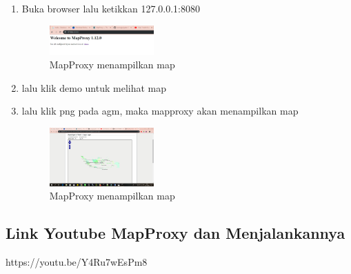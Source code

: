 \begin{enumerate}
  \item Buka browser lalu ketikkan 127.0.0.1:8080
  \hfill\break
  \begin{figure}[H]
  \includegraphics[width=4cm]{figures/tugas4/1174069/24.png}
  \centering
  \caption{MapProxy menampilkan map}
  \end{figure}

  \item lalu klik demo untuk melihat map
  \item lalu klik png pada agm, maka mapproxy akan menampilkan map
  \hfill\break
  \begin{figure}[H]
  \includegraphics[width=4cm]{figures/tugas4/1174069/25.png}
  \centering
  \caption{MapProxy menampilkan map}
  \end{figure}

\end{enumerate}

\subsection{Link Youtube MapProxy dan Menjalankannya}
https://youtu.be/Y4Ru7wEsPm8
